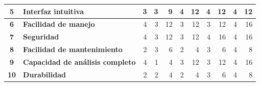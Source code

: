 \begin{table}[h]
{\begin{tabular}{|c|c|c|c|c|c|c|c|c|c|c|}
			\hline
			\textbf{5} & \multicolumn{1}{l|}{\textbf{Interfaz intuitiva}} & \multicolumn{1}{r|}{3} & \multicolumn{1}{r|}{\cellcolor[rgb]{ .949,  .863,  .859}3} & \multicolumn{1}{r|}{9} & \multicolumn{1}{r|}{\cellcolor[rgb]{ .863,  .902,  .945}4} & \multicolumn{1}{r|}{12} & \multicolumn{1}{r|}{\cellcolor[rgb]{ .922,  .945,  .871}4} & \multicolumn{1}{r|}{12} & \multicolumn{1}{r|}{\cellcolor[rgb]{ .992,  .914,  .851}4} & \multicolumn{1}{r|}{12} \bigstrut\\
			\hline
			\textbf{6} & \multicolumn{1}{l|}{\textbf{Facilidad de manejo }} & \multicolumn{1}{r|}{4} & \multicolumn{1}{r|}{\cellcolor[rgb]{ .949,  .863,  .859}3} & \multicolumn{1}{r|}{12} & \multicolumn{1}{r|}{\cellcolor[rgb]{ .863,  .902,  .945}3} & \multicolumn{1}{r|}{12} & \multicolumn{1}{r|}{\cellcolor[rgb]{ .922,  .945,  .871}3} & \multicolumn{1}{r|}{12} & \multicolumn{1}{r|}{\cellcolor[rgb]{ .992,  .914,  .851}4} & \multicolumn{1}{r|}{16} \bigstrut\\
			\hline
			\textbf{7} & \multicolumn{1}{l|}{\textbf{Seguridad}} & \multicolumn{1}{r|}{4} & \multicolumn{1}{r|}{\cellcolor[rgb]{ .949,  .863,  .859}3} & \multicolumn{1}{r|}{12} & \multicolumn{1}{r|}{\cellcolor[rgb]{ .863,  .902,  .945}3} & \multicolumn{1}{r|}{12} & \multicolumn{1}{r|}{\cellcolor[rgb]{ .922,  .945,  .871}4} & \multicolumn{1}{r|}{16} & \multicolumn{1}{r|}{\cellcolor[rgb]{ .992,  .914,  .851}4} & \multicolumn{1}{r|}{16} \bigstrut\\
			\hline
			\textbf{8} & \multicolumn{1}{l|}{\textbf{Facilidad de mantenimiento}} & \multicolumn{1}{r|}{2} & \multicolumn{1}{r|}{\cellcolor[rgb]{ .949,  .863,  .859}3} & \multicolumn{1}{r|}{6} & \multicolumn{1}{r|}{\cellcolor[rgb]{ .863,  .902,  .945}2} & \multicolumn{1}{r|}{4} & \multicolumn{1}{r|}{\cellcolor[rgb]{ .922,  .945,  .871}3} & \multicolumn{1}{r|}{6} & \multicolumn{1}{r|}{\cellcolor[rgb]{ .992,  .914,  .851}4} & \multicolumn{1}{r|}{8} \bigstrut\\
			\hline
			\textbf{9} & \multicolumn{1}{l|}{\textbf{Capacidad de análisis completo}} & \multicolumn{1}{r|}{4} & \multicolumn{1}{r|}{\cellcolor[rgb]{ .949,  .863,  .859}1} & \multicolumn{1}{r|}{4} & \multicolumn{1}{r|}{\cellcolor[rgb]{ .863,  .902,  .945}3} & \multicolumn{1}{r|}{12} & \multicolumn{1}{r|}{\cellcolor[rgb]{ .922,  .945,  .871}3} & \multicolumn{1}{r|}{12} & \multicolumn{1}{r|}{\cellcolor[rgb]{ .992,  .914,  .851}4} & \multicolumn{1}{r|}{16} \bigstrut\\
			\hline
			\textbf{10} & \multicolumn{1}{l|}{\textbf{Durabilidad}} & \multicolumn{1}{r|}{2} & \multicolumn{1}{r|}{\cellcolor[rgb]{ .949,  .863,  .859}2} & \multicolumn{1}{r|}{4} & \multicolumn{1}{r|}{\cellcolor[rgb]{ .863,  .902,  .945}2} & \multicolumn{1}{r|}{4} & \multicolumn{1}{r|}{\cellcolor[rgb]{ .922,  .945,  .871}3} & \multicolumn{1}{r|}{6} & \multicolumn{1}{r|}{\cellcolor[rgb]{ .992,  .914,  .851}4} & \multicolumn{1}{r|}{8} \bigstrut\\

\end{tabular}}
\end{table}
